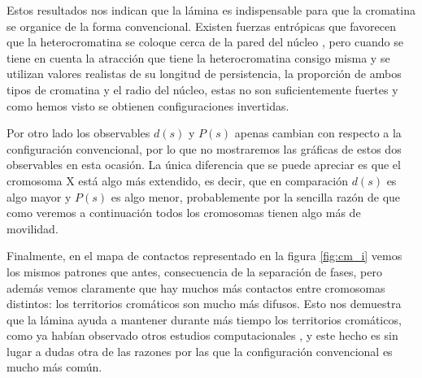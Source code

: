 Estos resultados nos indican que la lámina es indispensable para que la cromatina se organice de la forma convencional. Existen fuerzas entrópicas que favorecen que la heterocromatina se coloque cerca de la pared del núcleo \cite{Finan2010}, pero cuando se tiene en cuenta la atracción que tiene la heterocromatina consigo misma y se utilizan valores realistas de su longitud de persistencia, la proporción de ambos tipos de cromatina y el radio del núcleo, estas no son suficientemente fuertes y como hemos visto se obtienen configuraciones invertidas.

Por otro lado los observables $d(s)$ y $P(s)$ apenas cambian con respecto a la configuración convencional, por lo que no mostraremos las gráficas de estos dos observables en esta ocasión. La única diferencia que se puede apreciar es que el cromosoma X está algo más extendido, es decir, que en comparación $d(s)$ es algo mayor y $P(s)$ es algo menor, probablemente por la sencilla razón de que como veremos a continuación todos los cromosomas tienen algo más de movilidad.

Finalmente, en el mapa de contactos representado en la figura \ref{fig:cm_i} vemos los mismos patrones que antes, consecuencia de la separación de fases, pero además vemos claramente que hay muchos más contactos entre cromosomas distintos: los territorios cromáticos son mucho más difusos. Esto nos demuestra que la lámina ayuda a mantener durante más tiempo los territorios cromáticos, como ya habían observado otros estudios computacionales \cite{Kinney2018}, y este hecho es sin lugar a dudas otra de las razones por las que la configuración convencional es mucho más común.
